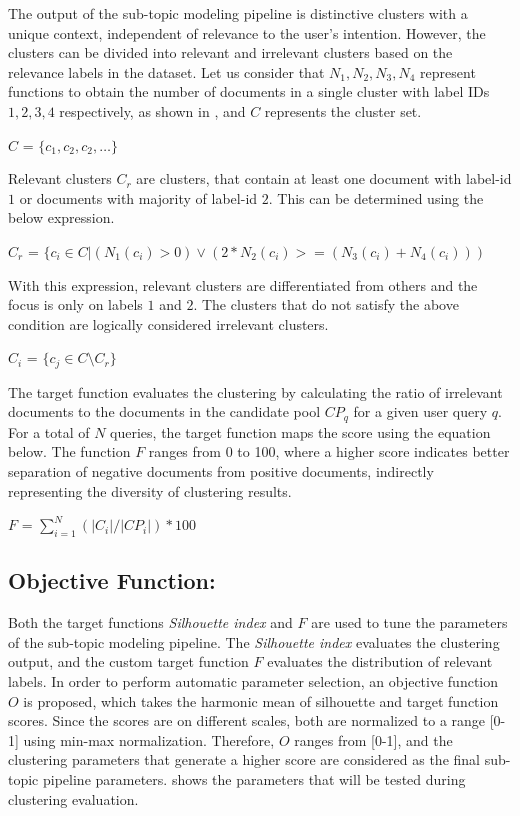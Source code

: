 		
The output of the sub-topic modeling pipeline is distinctive clusters with a unique context, independent of relevance to the user's intention. However, the clusters can be divided into relevant and irrelevant clusters based on the relevance labels in the dataset. Let us consider that $N_1, N_2, N_3, N_4$ represent functions to obtain the number of documents in a single cluster with label IDs $1, 2, 3, 4$ respectively, as shown in , and $C$ represents the cluster set.
		
		\centerline{$C$ = $\{c_1, c_2, c_2,\dots\}$}
		
		Relevant clusters $C_r$ are clusters, that contain at least one document with label-id $1$ or documents with majority of label-id $2$. This can be determined using the below expression.
		
		\centerline{$C_r$ = $\{c_i \in C | (N_1(c_i) > 0) \lor (2 * N_2(c_i) >= (N_3(c_i) + N_4(c_i))) $}
		
		With this expression, relevant clusters are differentiated from others and the focus is only on labels $1$ and $2$. The clusters that do not satisfy the above condition are logically considered irrelevant clusters. 
		
		\centerline{$C_i$ = $\{c_j \in C \setminus C_r\} $}
		
The target function evaluates the clustering by calculating the ratio of irrelevant documents to the documents in the candidate pool $CP_q$ for a given user query $q$. For a total of $N$ queries, the target function maps the score using the equation below. The function $F$ ranges from 0 to 100, where a higher score indicates better separation of negative documents from positive documents, indirectly representing the diversity of clustering results.

		
		\centerline{$F$ = $\sum\limits_{i=1}^N (|C_i|/|CP_i|) * 100 $}
		
		\subsection{Objective Function:} Both the target functions \textit{Silhouette index} and $F$ are used to tune the parameters of the sub-topic modeling pipeline. The \textit{Silhouette index} evaluates the clustering output, and the custom target function $F$ evaluates the distribution of relevant labels. In order to perform automatic parameter selection, an objective function $O$ is proposed, which takes the harmonic mean of silhouette and target function scores. Since the scores are on different scales, both are normalized to a range [0-1] using min-max normalization. Therefore, $O$ ranges from [0-1], and the clustering parameters that generate a higher score are considered as the final sub-topic pipeline parameters.  shows the parameters that will be tested during clustering evaluation.\\
		
